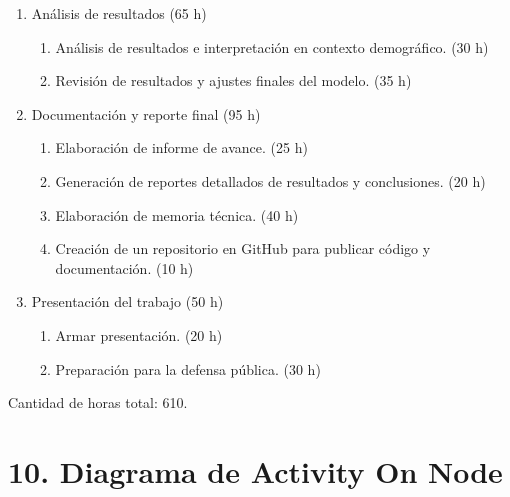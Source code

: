 \documentclass[
11pt, %
]{charter}
\begin{document}
\begin{enumerate}
	\item Análisis de resultados (65 h)
	\begin{enumerate}
		\item Análisis de resultados e interpretación en contexto demográfico. (30 h)
		\item Revisión de resultados y ajustes finales del modelo. (35 h)
	\end{enumerate}
	
	\item Documentación y reporte final (95 h)
	\begin{enumerate}
		\item Elaboración de informe de avance. (25 h)
		\item Generación de reportes detallados de resultados y conclusiones. (20 h)
		\item Elaboración de memoria técnica. (40 h)
		\item Creación de un repositorio en GitHub para publicar código y documentación. (10 h)

	\end{enumerate}

	\item Presentación del trabajo (50 h)
		\begin{enumerate}
			\item Armar presentación. (20 h)
			\item Preparación para la defensa pública. (30 h)
		\end{enumerate}
		
\end{enumerate}

Cantidad de horas total: 610.

%
%
%
%



\section{10. Diagrama de Activity On Node}
\label{sec:AoN}
\end{document}
